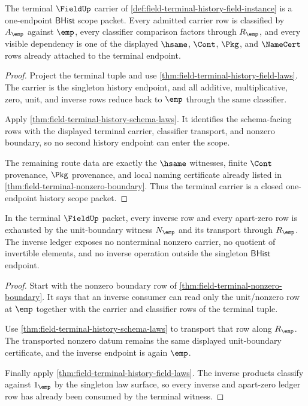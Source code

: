 \begin{theorem}
\label{thm:field-terminal-history-scope-package}
The terminal $\FieldUp$ carrier of
\autoref{def:field-terminal-history-field-instance} is a one-endpoint
$\mathsf{BHist}$ scope packet. Every admitted carrier row is classified by
$A_{\emp}$ against $\emp$, every classifier comparison factors through
$R_{\emp}$, and every visible dependency is one of the displayed $\hsame$,
$\Cont$, $\Pkg$, and $\NameCert$ rows already attached to the terminal
endpoint.
\end{theorem}
\begin{proof}
Project the terminal tuple and use
\autoref{thm:field-terminal-history-field-laws}. The carrier is the singleton
history endpoint, and all additive, multiplicative, zero, unit, and inverse
rows reduce back to $\emp$ through the same classifier.

Apply \autoref{thm:field-terminal-history-schema-laws}. It identifies the
schema-facing rows with the displayed terminal carrier, classifier transport,
and nonzero boundary, so no second history endpoint can enter the scope.

The remaining route data are exactly the $\hsame$ witnesses, finite $\Cont$
provenance, $\Pkg$ provenance, and local naming certificate already listed in
\autoref{thm:field-terminal-nonzero-boundary}. Thus the terminal carrier is a
closed one-endpoint history scope packet.
\end{proof}

\begin{theorem}
\label{thm:field-terminal-inverse-ledger-scope}
In the terminal $\FieldUp$ packet, every inverse row and every apart-zero row is
exhausted by the unit-boundary witness $N_{\emp}$ and its transport through
$R_{\emp}$. The inverse ledger exposes no nonterminal nonzero carrier, no
quotient of invertible elements, and no inverse operation outside the singleton
$\mathsf{BHist}$ endpoint.
\end{theorem}
\begin{proof}
Start with the nonzero boundary row of
\autoref{thm:field-terminal-nonzero-boundary}. It says that an inverse consumer
can read only the unit/nonzero row at $\emp$ together with the carrier and
classifier rows of the terminal tuple.

Use \autoref{thm:field-terminal-history-schema-laws} to transport that row
along $R_{\emp}$. The transported nonzero datum remains the same displayed
unit-boundary certificate, and the inverse endpoint is again $\emp$.

Finally apply \autoref{thm:field-terminal-history-field-laws}. The inverse
products classify against $1_{\emp}$ by the singleton law surface, so every
inverse and apart-zero ledger row has already been consumed by the terminal
witness.
\end{proof}

